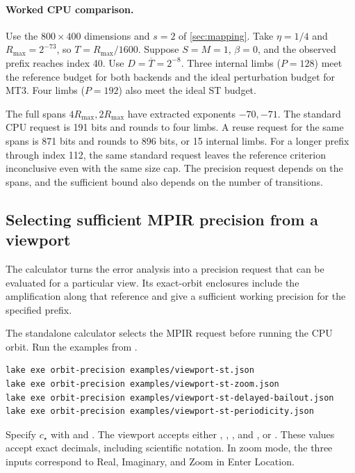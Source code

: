 \paragraph{Worked CPU comparison.}
Use the \(800\times400\) dimensions and \(s=2\) of \cref{sec:mapping}.
Take \(\eta=1/4\) and \(R_{\max}=2^{-73}\), so \(T=R_{\max}/1600\).
Suppose \(S=M=1\), \(\beta=0\), and the observed prefix reaches index 40.
Use \(D=\overline T=2^{-8}\). Three internal limbs (\(P=128\)) meet the
reference budget for both backends and the ideal perturbation budget
for MT3. Four limbs (\(P=192\)) also meet the ideal ST budget.

The full spans \(4R_{\max},2R_{\max}\) have extracted exponents \(-70,-71\).
The standard CPU request is 191 bits and rounds to four limbs. A reuse
request for the same spans is 871 bits and rounds to 896 bits, or 15
internal limbs. For a longer prefix through index 112, the same standard
request leaves the reference criterion inconclusive even with the same
size cap. The precision request depends on the spans, and the sufficient
bound also depends on the number of transitions.

\subsection{Selecting sufficient MPIR precision from a viewport}
\label{subsec:reference-orbit-proof-precision-estimator}

The calculator turns the error analysis into a precision request that
can be evaluated for a particular view. Its exact-orbit enclosures include
the amplification along that reference and give a sufficient working
precision for the specified prefix.

The standalone calculator selects the MPIR request before running the CPU
orbit. Run the examples from .
\begin{lstlisting}
lake exe orbit-precision examples/viewport-st.json
lake exe orbit-precision examples/viewport-st-zoom.json
lake exe orbit-precision examples/viewport-st-delayed-bailout.json
lake exe orbit-precision examples/viewport-st-periodicity.json
\end{lstlisting}
Specify \(c_\star\) with  and . The viewport
accepts either , , , and , or
. These values accept exact decimals, including
scientific notation. In zoom mode, the three inputs correspond to Real,
Imaginary, and Zoom in Enter Location.


